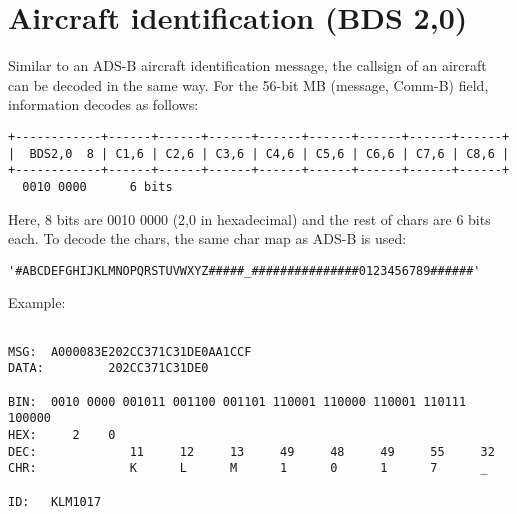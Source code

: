 \section{Aircraft identification (BDS
2,0)}\label{aircraft-identification-bds-20}

Similar to an ADS-B aircraft identification message, the callsign of an
aircraft can be decoded in the same way. For the 56-bit MB (message,
Comm-B) field, information decodes as follows:

\begin{verbatim}
+------------+------+------+------+------+------+------+------+------+
|  BDS2,0  8 | C1,6 | C2,6 | C3,6 | C4,6 | C5,6 | C6,6 | C7,6 | C8,6 |
+------------+------+------+------+------+------+------+------+------+
  0010 0000      6 bits
\end{verbatim}

Here, 8 bits are 0010 0000 (2,0 in hexadecimal) and the rest of chars
are 6 bits each. To decode the chars, the same char map as ADS-B is
used:

\begin{verbatim}
'#ABCDEFGHIJKLMNOPQRSTUVWXYZ#####_###############0123456789######'

\end{verbatim}

Example:

\begin{verbatim}

MSG:  A000083E202CC371C31DE0AA1CCF
DATA:         202CC371C31DE0

BIN:  0010 0000 001011 001100 001101 110001 110000 110001 110111 100000
HEX:     2    0
DEC:             11     12     13     49     48     49     55     32
CHR:             K      L      M      1      0      1      7      _

ID:   KLM1017
\end{verbatim}
